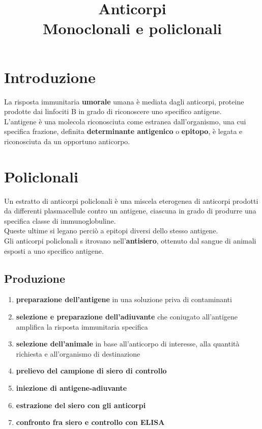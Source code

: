 \documentclass[a4paper, 12pt]{article}
\date{}
\title{%
  Anticorpi \\
  \large Monoclonali e policlonali
}
\begin{document}
\maketitle

\section{Introduzione}
La risposta immunitaria \textbf{umorale} umana è mediata dagli anticorpi, proteine prodotte dai linfociti B in grado di riconoscere uno specifico antigene.\\
L'antigene è una molecola riconosciuta come estranea dall'organismo, una cui specifica frazione, definita \textbf{determinante antigenico} o \textbf{epitopo}, è legata e riconosciuta da un opportuno anticorpo.

\section{Policlonali}
Un estratto di anticorpi policlonali è una miscela eterogenea di anticorpi prodotti da differenti plasmacellule contro un antigene, ciascuna in grado di produrre una specifica classe di immunoglobuline.\\
Queste ultime si legano perciò a epitopi diversi dello stesso antigene.\\
Gli anticorpi policlonali s itrovano nell'\textbf{antisiero}, ottenuto dal sangue di animali esposti a uno specifico antigene.

\subsection{Produzione}
\begin{enumerate}
\item \textbf{preparazione dell'antigene} in una soluzione priva di contaminanti
\item \textbf{selezione e preparazione dell'adiuvante} che coniugato all'antigene amplifica la risposta immunitaria specifica
\item \textbf{selezione dell'animale} in base all'anticorpo di interesse, alla quantità richiesta e all'organismo di destinazione
\item \textbf{prelievo del campione di siero di controllo}
\item \textbf{iniezione di antigene-adiuvante}
\item \textbf{estrazione del siero con gli anticorpi}
\item \textbf{confronto fra siero e controllo con ELISA}
\end{enumerate}
\end{document}

